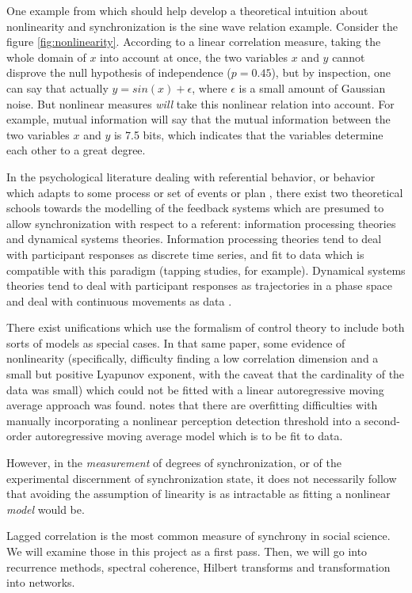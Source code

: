 \documentclass[12pt]{article}
\begin{document}
One example from \cite{anscombe} which should help develop a theoretical intuition about nonlinearity and synchronization is the sine wave relation example. Consider the figure \ref{fig:nonlinearity}. According to a linear correlation measure, taking the whole domain of $x$ into account at once, the two variables $x$ and $y$ cannot disprove the null hypothesis of independence ($p=0.45$), but by inspection, one can say that actually $y = sin(x) + \epsilon$, where $\epsilon$ is a small amount of Gaussian noise. But nonlinear measures \emph{will} take this nonlinear relation into account. For example, mutual information will say that the mutual information between the two variables $x$ and $y$ is 7.5 bits, which indicates that the variables determine each other to a great degree.

In the psychological literature dealing with referential behavior, or behavior which adapts to some process or set of events or plan \cite{pressing}, there exist two theoretical schools towards the modelling of the feedback systems which are presumed to allow synchronization with respect to a referent: information processing theories and dynamical systems theories. Information processing theories tend to deal with participant responses as discrete time series, and fit to data which is compatible with this paradigm (tapping studies, for example). Dynamical systems theories tend to deal with participant responses as trajectories in a phase space and deal with continuous movements as data \cite{syncreview}.

There exist unifications \cite{pressing} which use the formalism of control theory to include both sorts of models as special cases. In that same paper, some evidence of nonlinearity (specifically, difficulty finding a low correlation dimension and a small but positive Lyapunov exponent, with the caveat that the cardinality of the data was small) which could not be fitted with a linear autoregressive moving average approach was found. \cite{schulze} notes that there are overfitting difficulties with manually incorporating a nonlinear perception detection threshold into a second-order autoregressive moving average model which is to be fit to data.

However, in the \emph{measurement} of degrees of synchronization, or of the experimental discernment of synchronization state, it does not necessarily follow that avoiding the assumption of linearity is as intractable as fitting a nonlinear \emph{model} would be.

Lagged correlation is the most common measure of synchrony in social science. We will examine those in this project as a first pass. Then, we will go into recurrence methods, spectral coherence, Hilbert transforms and transformation into networks.
\end{document}
